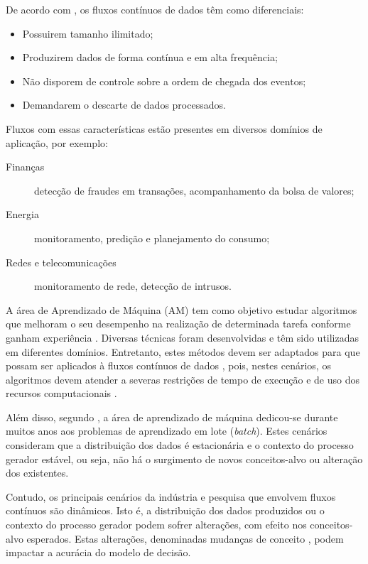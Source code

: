 \documentclass[qual, classic, a4paper]{ufbathesis}
\begin{document}
De acordo com \cite{Babcock:2002:MID:543613.543615}, os fluxos contínuos de dados têm como diferenciais:
\begin{itemize}
    \item Possuirem tamanho ilimitado;
    \item Produzirem dados de forma contínua e em alta frequência;
    \item Não disporem de controle sobre a ordem de chegada dos eventos;
    \item Demandarem o descarte de dados processados.
\end{itemize}

Fluxos com essas características estão presentes em diversos domínios de aplicação, por exemplo:
\begin{description}
    \item[Finanças] detecção de fraudes em transações, acompanhamento da bolsa de valores;
    \item[Energia] monitoramento, predição e planejamento do consumo;
    \item[Redes e telecomunicações] monitoramento de rede, detecção de intrusos.
\end{description}

A área de Aprendizado de Máquina (AM) tem como objetivo estudar algoritmos que melhoram o seu desempenho na realização de determinada tarefa conforme ganham experiência \cite{Mitchell:1997:ML:541177}.
Diversas técnicas foram desenvolvidas e têm sido utilizadas em diferentes domínios.
Entretanto, estes métodos devem ser adaptados para que possam ser aplicados à fluxos contínuos de dados \cite{Aggarwal:2006:DSM:1196418},
pois, nestes cenários, os algoritmos devem atender a severas restrições de tempo de execução e de uso dos recursos computacionais \cite{Bifet:2009:ALM:1656274.1656287}.

Além disso, segundo \cite{Gama:2010:KDD:1855075}, a área de aprendizado de máquina dedicou-se durante muitos anos aos problemas de aprendizado em lote (\textit{batch}).
Estes cenários consideram que a distribuição dos dados é estacionária e o contexto do processo gerador estável, 
ou seja, 
não há o surgimento de novos conceitos-alvo ou alteração dos existentes.

Contudo, os principais cenários da indústria e pesquisa que envolvem fluxos contínuos são dinâmicos.
Isto é, a distribuição dos dados produzidos ou o contexto do processo gerador podem sofrer alterações, com efeito nos conceitos-alvo esperados.
Estas alterações, denominadas mudanças de conceito \cite{Gama:2010:KDD:1855075}, podem impactar a acurácia do modelo de decisão.
\end{document}
